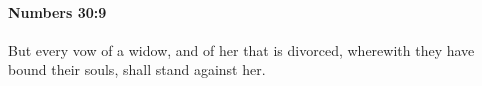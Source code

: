 
		\paragraph{Numbers 30:9} %
			\label{NUMBERS-30-9}

			But every vow of a widow, and of her that is divorced, wherewith they have bound their souls, shall stand against her.


